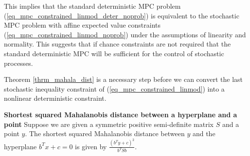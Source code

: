 This implies that the standard deterministic MPC problem (\ref{eq_mpc_constrained_linmod_deter_noprob}) is equivalent to the stochastic MPC problem with affine expected value constraints (\ref{eq_mpc_constrained_linmod_noprob}) under the assumptions of linearity and normality. This suggests that if chance constraints are not required that the standard deterministic MPC will be sufficient for the control of stochastic processes.

Theorem \ref{thrm_mahala_dist} is a necessary step before we can convert the last stochastic inequality constraint of (\ref{eq_mpc_constrained_linmod}) into a nonlinear deterministic constraint.
\begin{thrm}
\textbf{Shortest squared Mahalanobis distance between a hyperplane and a point} Suppose we are given a symmetric positive semi-definite matrix $S$ and a point $y$. The shortest squared Mahalanobis distance between $y$ and the hyperplane $b^Tx+c=0$ is given by $\frac{(b^Ty+c)^2}{b^TSb}$.
\label{thrm_mahala_dist}
\end{thrm}
